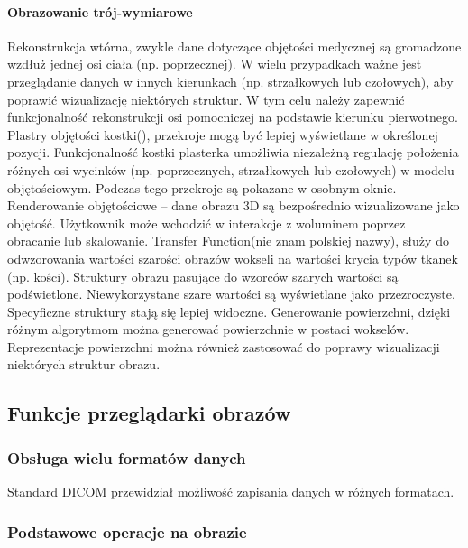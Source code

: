 \paragraph{Obrazowanie trój-wymiarowe}

Rekonstrukcja wtórna, zwykle dane dotyczące objętości medycznej są gromadzone wzdłuż jednej osi ciała (np. poprzecznej).
W wielu przypadkach ważne jest przeglądanie danych w innych kierunkach (np. strzałkowych lub czołowych), aby poprawić wizualizację niektórych struktur.
W tym celu należy zapewnić funkcjonalność rekonstrukcji osi pomocniczej na podstawie kierunku pierwotnego.
Plastry objętości kostki(), przekroje mogą być lepiej wyświetlane w określonej pozycji.
Funkcjonalność kostki plasterka umożliwia niezależną regulację położenia różnych osi wycinków (np. poprzecznych, strzałkowych lub czołowych) w modelu objętościowym.
Podczas tego przekroje są pokazane w osobnym oknie.
Renderowanie objętościowe – dane obrazu 3D są bezpośrednio wizualizowane jako objętość.
Użytkownik może wchodzić w interakcje z woluminem poprzez obracanie lub skalowanie.
Transfer Function(nie znam polskiej nazwy), służy do odwzorowania wartości szarości obrazów wokseli na wartości krycia typów tkanek (np. kości). Struktury obrazu pasujące do wzorców szarych wartości są podświetlone. Niewykorzystane szare wartości są wyświetlane jako
przezroczyste. Specyficzne struktury stają się lepiej widoczne.
Generowanie powierzchni, dzięki różnym algorytmom można generować powierzchnie w postaci wokselów. Reprezentacje powierzchni można również zastosować do poprawy wizualizacji niektórych struktur obrazu.

\subsection{Funkcje przeglądarki obrazów}

\subsubsection{Obsługa wielu formatów danych}

Standard DICOM przewidział możliwość zapisania danych w różnych formatach.

\subsubsection{Podstawowe operacje na obrazie}

